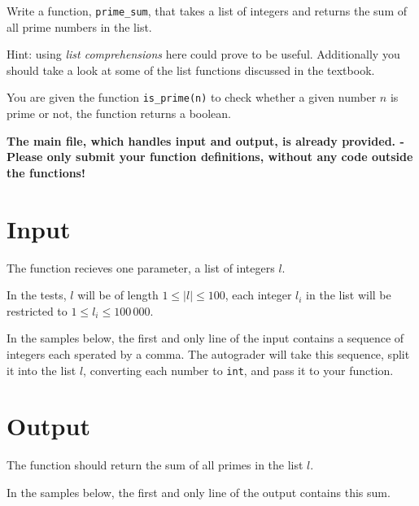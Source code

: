 
Write a function, \texttt{prime\_sum}, that takes a list of integers
and returns the sum of all prime numbers in the list.

Hint: using \emph{list comprehensions} here could prove to be useful.
Additionally you should take a look at some of the list functions discussed in the textbook. 

You are given the function \texttt{is\_prime(n)} to check whether a given number $n$ is prime or not, 
the function returns a boolean.

\textbf{The main file, which handles input and output, is already provided. -
Please only submit your function definitions, without any code outside the functions!}

\section*{Input}
The function recieves one parameter,
a list of integers $l$.

In the tests, $l$ will be of length $1 \le |l| \le 100$,
each integer $l_i$ in the list will be restricted to $1 \le l_i \le 100\,000$.

In the samples below,
the first and only line of the input contains a sequence of integers each sperated by a comma.
The autograder will take this sequence, split it into the list $l$,
converting each number to \texttt{int}, and pass it to your function.

\section*{Output}
The function should return the sum of all primes in the list $l$.

In the samples below,
the first and only line of the output contains this sum.

